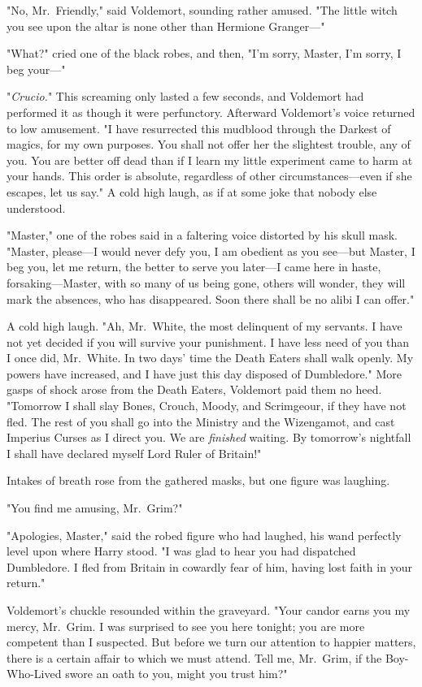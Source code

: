 "No, Mr.~Friendly," said Voldemort, sounding rather amused. "The little witch
you see upon the altar is none other than Hermione Granger---"

"What?" cried one of the black robes, and then, "I'm sorry, Master, I'm sorry,
I beg your---"

"\emph{Crucio.}" This screaming only lasted a few seconds, and Voldemort had
performed it as though it were perfunctory. Afterward Voldemort's voice
returned to low amusement. "I have resurrected this mudblood through the
Darkest of magics, for my own purposes. You shall not offer her the slightest
trouble, any of you. You are better off dead than if I learn my little
experiment came to harm at your hands. This order is absolute, regardless of
other circumstances---even if she escapes, let us say." A cold high laugh, as
if at some joke that nobody else understood.

"Master," one of the robes said in a faltering voice distorted by his skull
mask. "Master, please---I would never defy you, I am obedient as you see---but
Master, I beg you, let me return, the better to serve you later---I came here
in haste, forsaking---Master, with so many of us being gone, others will
wonder, they will mark the absences, who has disappeared. Soon there shall be
no alibi I can offer."

A cold high laugh. "Ah, Mr.~White, the most delinquent of my servants. I have
not yet decided if you will survive your punishment. I have less need of you
than I once did, Mr.~White. In two days' time the Death Eaters shall walk
openly. My powers have increased, and I have just this day disposed of
Dumbledore." More gasps of shock arose from the Death Eaters, Voldemort paid
them no heed. "Tomorrow I shall slay Bones, Crouch, Moody, and Scrimgeour, if
they have not fled. The rest of you shall go into the Ministry and the
Wizengamot, and cast Imperius Curses as I direct you. We are \emph{finished}
waiting. By tomorrow's nightfall I shall have declared myself Lord Ruler of
Britain!"

Intakes of breath rose from the gathered masks, but one figure was laughing.

"You find me amusing, Mr.~Grim?"

"Apologies, Master," said the robed figure who had laughed, his wand perfectly
level upon where Harry stood. "I was glad to hear you had dispatched
Dumbledore. I fled from Britain in cowardly fear of him, having lost faith in
your return."

Voldemort's chuckle resounded within the graveyard. "Your candor earns you my
mercy, Mr.~Grim. I was surprised to see you here tonight; you are more
competent than I suspected. But before we turn our attention to happier
matters, there is a certain affair to which we must attend. Tell me, Mr.~Grim,
if the Boy-Who-Lived swore an oath to you, might you trust him?"

